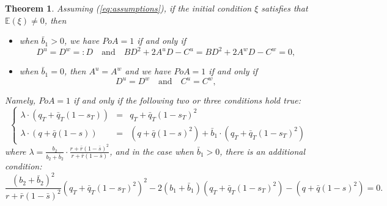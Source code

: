 \documentclass[11pt]{article}
\newtheorem{theorem}{Theorem}
\begin{document}
\begin{theorem}
	Assuming (\ref{eq:assumptions}), if the initial condition $\xi$ satisfies that $\mathbb{E}(\xi)  \neq 0$, then 
	\begin{itemize}
		\item when $\bar{b}_1 > 0$, we have $PoA = 1$ if and only if
		\begin{equation}
		D^u = D^w =:D \quad \text{and} \quad B D^2 + 2 A^{u} D - C^{u} = B D^2 + 2 A^{w} D - C^w  = 0,
		\label{eq:PoA=1_condition_b1_bar>0}
		\end{equation}
		\item when $\bar{b}_1 = 0$, then $A^u = A^w$ and we have $PoA = 1$ if and only if 
		\begin{equation}
			D^u = D^w \quad \text{and} \quad C^u = C^w, 
		\label{eq:PoA=1_condition_b1_bar=0}
		\end{equation}
	\end{itemize}
	Namely, $PoA = 1$ if and only if the following two or three conditions hold true:
	\begin{equation*}
	\left\{
	\begin{array}{rcl}
	\displaystyle \lambda \cdot (q_T + \bar{q}_T(1-s_T) )  &=& q_T + \bar{q}_T (1- s_T)^2\\
	\displaystyle \lambda \cdot (q+ \bar{q}(1-s)) &=& (q + \bar{q}(1-s)^2) + \bar{b}_1 \cdot (q_T + \bar{q}_T (1 - s_T)^2) 
	\end{array}
	\right.
	\end{equation*}
	where $\lambda = \frac{b_2}{b_2 + \bar{b}_2}\cdot \frac{ r + \bar{r}(1-\bar{s})^2 }{r + \bar{r}(1-\bar{s})}$, and in the case when $\bar{b}_1 > 0$, there is an additional condition:
	$$ \frac{(b_2+ \bar{b}_2)^2}{r + \bar{r}(1-\bar{s})^2} ( q_T + \bar{q}_T(1-s_T)^2 )^2 - 2 (b_1 + \bar{b}_1) ( q_T + \bar{q}_T(1-s_T)^2 )  - ( q + \bar{q}(1-s)^2 ) = 0. $$

	\label{thm:PoA_equivalent_1}
\end{theorem}
\end{document}
